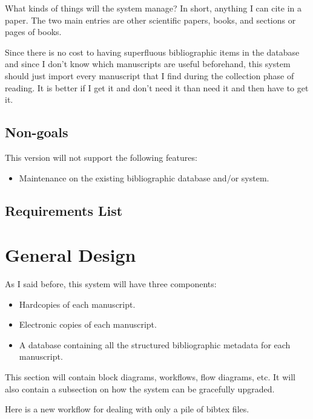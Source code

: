 \documentclass[letterpaper,12pt]{article}
\begin{document}
What kinds of things will the system manage? In short, anything I can cite in a paper. The two main entries are other scientific papers, books, and sections or pages of books.



Since there is no cost to having superfluous bibliographic items in the database and since I don't know which manuscripts are useful beforehand, this system should just import every manuscript that I find during the collection phase of reading. It is better if I get it and don't need it than need it and then have to get it.








\subsection{Non-goals}
This version will not support the following features:

\begin{itemize}
\item Maintenance on the existing bibliographic database and/or system.
\end{itemize}


\subsection{Requirements List}






\section{General Design}
As I said before, this system will have three components:

\begin{itemize}
\item Hardcopies of each manuscript.
\item Electronic copies of each manuscript.
\item A database containing all the structured bibliographic metadata for each manuscript.
\end{itemize}


This section will contain block diagrams, workflows, flow diagrams, etc. It will also contain a subsection on how the system can be gracefully upgraded.

Here is a new workflow for dealing with only a pile of bibtex files. 
\end{document}

